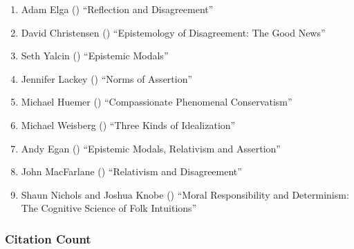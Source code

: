 \documentclass[
  10pt,
  letterpaper,
  DIV=11,
  numbers=noendperiod,
  twoside]{scrartcl}
\providecommand{\tightlist}{%
  \setlength{\itemsep}{0pt}\setlength{\parskip}{0pt}}\usepackage{longtable,booktabs,array}
\begin{document}
\begin{enumerate}
\def\labelenumi{\arabic{enumi}.}
\tightlist
\item
  Adam Elga () ``Reflection and
  Disagreement''
\item
  David Christensen ()
  ``Epistemology of Disagreement: The Good News''
\item
  Seth Yalcin () ``Epistemic
  Modals''
\item
  Jennifer Lackey () ``Norms of
  Assertion''
\item
  Michael Huemer ()
  ``Compassionate Phenomenal Conservatism''
\item
  Michael Weisberg () ``Three
  Kinds of Idealization''
\item
  Andy Egan () ``Epistemic
  Modals, Relativism and Assertion''
\item
  John MacFarlane () ``Relativism
  and Disagreement''
\item
  Shaun Nichols and Joshua Knobe
  () ``Moral Responsibility and
  Determinism: The Cognitive Science of Folk Intuitions''
\end{enumerate}

\subsubsection*{Citation Count}\label{sec-count-2007}
\end{document}
